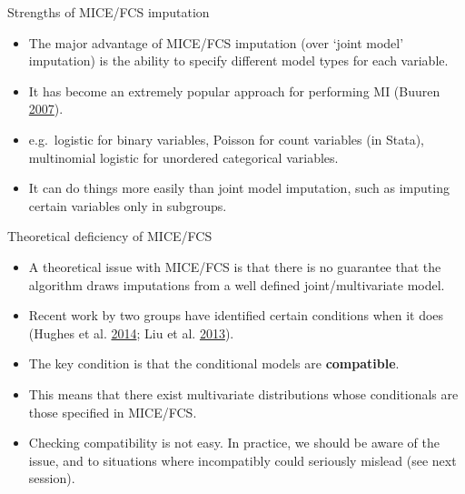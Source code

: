 \documentclass[ignorenonframetext,]{beamer}
\providecommand{\tightlist}{%
  \setlength{\itemsep}{0pt}\setlength{\parskip}{0pt}}
\begin{document}
\begin{frame}{Strengths of MICE/FCS imputation}
\protect\hypertarget{strengths-of-micefcs-imputation}{}

\begin{itemize}
\tightlist
\item
  The major advantage of MICE/FCS imputation (over `joint model'
  imputation) is the ability to specify different model types for each
  variable.
\item
  It has become an extremely popular approach for performing MI (Buuren
  \protect\hyperlink{ref-Buuren:2007}{2007}).
\item
  e.g.~logistic for binary variables, Poisson for count variables (in
  Stata), multinomial logistic for unordered categorical variables.
\item
  It can do things more easily than joint model imputation, such as
  imputing certain variables only in subgroups.
\end{itemize}

\end{frame}

\begin{frame}{Theoretical deficiency of MICE/FCS}
\protect\hypertarget{theoretical-deficiency-of-micefcs}{}

\begin{itemize}
\tightlist
\item
  A theoretical issue with MICE/FCS is that there is no guarantee that
  the algorithm draws imputations from a well defined joint/multivariate
  model.
\item
  Recent work by two groups have identified certain conditions when it
  does (Hughes et al. \protect\hyperlink{ref-Hughes2014}{2014}; Liu et
  al. \protect\hyperlink{ref-Liu2013}{2013}).
\item
  The key condition is that the conditional models are
  \textbf{compatible}.
\item
  This means that there exist multivariate distributions whose
  conditionals are those specified in MICE/FCS.
\item
  Checking compatibility is not easy. In practice, we should be aware of
  the issue, and to situations where incompatibly could seriously
  mislead (see next session).
\end{itemize}

\end{frame}
\end{document}
